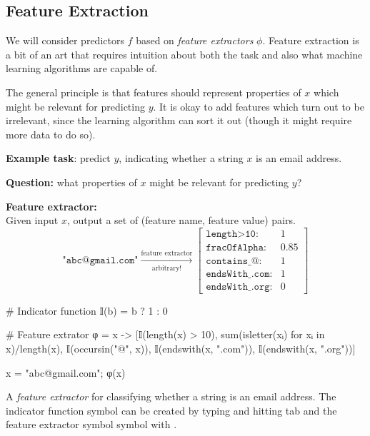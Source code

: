 

\subsection{Feature Extraction} %
\label{sub:feature_extraction}

We will consider predictors $f$ based on \textit{feature extractors} $\phi$. Feature extraction is a bit of an art that requires intuition about both the task and also what machine learning algorithms are capable of.

The general principle is that features should represent properties of $x$ which might be relevant for predicting $y$. It is okay to add features which turn out to be irrelevant, since the learning algorithm can sort it out (though it might require more data to do so).

\begin{example}


\br

\textbf{Example task}: predict $y$, indicating whether a string $x$ is an email address.

\textbf{Question:} what properties of $x$ might be relevant for predicting $y$?

\textbf{Feature extractor:}\\
\indent\indent Given input $x$, output a set of (feature name, feature value) pairs.
\[
\texttt{"abc@gmail.com"} \xrightarrow[\text{arbitrary!}]{\text{feature extractor}} \begin{bmatrix}
\texttt{length>10}: & 1\\
\texttt{fracOfAlpha}: & 0.85\\
\texttt{contains\_@}: & 1\\
\texttt{endsWith\_.com}: & 1\\
\texttt{endsWith\_.org}: & 0
\end{bmatrix}
\]

\begin{exalgorithm}
\begin{juliaverbatim}
# Indicator function \bbI
𝕀(b) = b ? 1 : 0

# Feature extrator \phi
φ = x -> [𝕀(length(x) > 10),
         sum(isletter(xᵢ) for xᵢ in x)/length(x),
         𝕀(occursin("@", x)),
         𝕀(endswith(x, ".com")),
         𝕀(endswith(x, ".org"))]
\end{juliaverbatim}
\end{exalgorithm}

\begin{juliaconsole}
x = "abc@gmail.com";
φ(x)
\end{juliaconsole}

\caption{
    \label{ex:feature_extrator}
    A \textit{feature extractor} for classifying whether a string is an email address.
    The indicator function symbol  can be created by typing \jlv{\bbI} and hitting tab and the feature extractor symbol  symbol with \jlv{\phi}.
}
\end{example}


